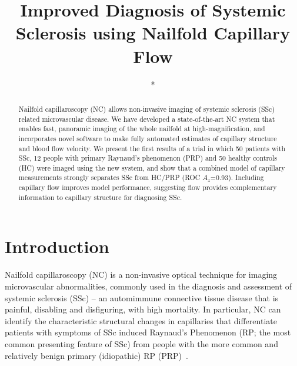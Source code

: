 \documentclass[runningheads,a4paper]{llncs}
\begin{document}
\mainmatter  %

\title{Improved Diagnosis of Systemic Sclerosis using Nailfold Capillary Flow}


%
%
\author{*}%

\institute{*}
\authorrunning{*} %

\tocauthor{}
\maketitle


\begin{abstract}
Nailfold capillaroscopy (NC) allows non-invasive imaging of systemic sclerosis (SSc) related microvascular disease. We have developed a state-of-the-art NC system that enables fast, panoramic imaging of the whole nailfold at high-magnification, and incorporates novel software to make fully automated estimates of capillary structure and blood flow velocity. We present the first results of a trial in which 50 patients with SSc, 12 people with primary Raynaud’s phenomenon (PRP) and 50 healthy controls (HC) were imaged using the new system, and show that a combined model of capillary measurements strongly separates SSc from HC/PRP (ROC $A_z$=0.93). Including capillary flow improves model performance, suggesting flow provides complementary information to capillary structure for diagnosing SSc.
\end{abstract}

\section{Introduction}
\label{s:introduction}
Nailfold capillaroscopy (NC) is a non-invasive optical technique for imaging microvascular abnormalities, commonly used in the diagnosis and assessment of systemic sclerosis (SSc) -- an automimmune connective tissue disease that is painful, disabling and disfiguring, with high mortality. In particular, NC can identify the characteristic structural changes in capillaries that differentiate patients with symptoms of SSc induced Raynaud’s Phenomenon (RP; the most common presenting feature of SSc) from people with the more common and relatively benign primary (idiopathic) RP (PRP)~\cite{HerrickCOinR2011,Cutolo_etal_BPRCR08}.
\end{document}
